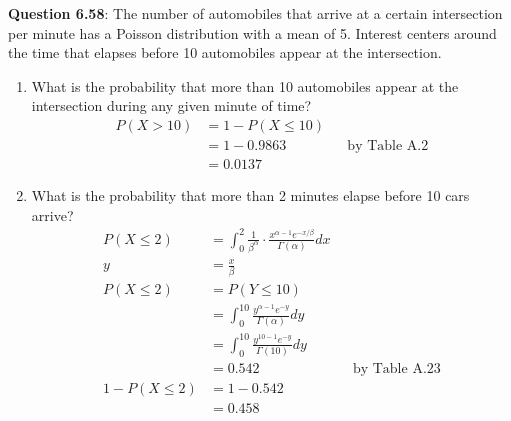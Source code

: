 \documentclass{article}
\begin{document}
    \noindent\textbf{Question 6.58}: The number of automobiles that arrive at a certain 
    intersection per minute has a Poisson distribution with a mean of 5. Interest centers 
    around the time that elapses before 10 automobiles appear at the intersection.
        \begin{enumerate}[label = (\alph*) ]
            \item What is the probability that more than 10 automobiles appear at the 
            intersection during any given minute of time?
                \begin{align*}
                    P(X>10)&= 1-P(X\leq 10)\\
                    &= 1-0.9863 &&\text{by Table A.2}\\
                    &= 0.0137
                \end{align*}
            \item What is the probability that more than 2 minutes elapse before 10 
            cars arrive?
                \begin{align*}
                    P(X\leq2) &= \int_0^2 \frac{1}{\beta^\alpha}\cdot \frac{x^{\alpha-1}e^{-x/\beta}}{\Gamma(\alpha)}dx\\
                    y&= \frac{x}{\beta}\\
                    P(X\leq 2) &= P(Y\leq 10)\\
                               &= \int_0^{10}\frac{y^{\alpha-1}e^{-y}}{\Gamma(\alpha)}dy\\
                               &= \int_0^{10}\frac{y^{10-1}e^{-y}}{\Gamma(10)}dy\\
                               &= 0.542 &&\text{by Table A.23}\\
                    1 - P(X\leq 2) &= 1 - 0.542\\
                                   &= 0.458
                \end{align*}
        \end{enumerate}
\end{document}
